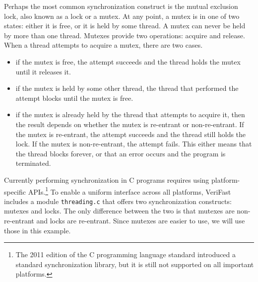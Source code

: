 \documentclass{article}
\begin{document}
Perhaps the most common synchronization construct is the mutual
exclusion lock, also known as a lock or a mutex. At any point,
a mutex is in one of two states: either it is free, or it is
held by some thread. A mutex can never be held by more than one
thread. Mutexes provide two operations: acquire and release.
When a thread attempts to acquire a mutex, there are two cases.
\begin{itemize}
\item if the mutex is free, the attempt succeeds and the
    thread holds the mutex until it releases it.
\item if the mutex is held by some other thread, the thread
    that performed the attempt blocks until the mutex is
    free.
\item if the mutex is already held by the thread that
    attempts to acquire it, then the result depends on
    whether the mutex is re-entrant or non-re-entrant. If
    the mutex is re-entrant, the attempt succeeds and the
    thread still holds the lock. If the mutex is
    non-re-entrant, the attempt fails. This either means
    that the thread blocks forever, or that an error occurs
    and the program is terminated.
\end{itemize}

Currently performing synchronization in C programs requires using platform-specific APIs.\footnote{The 2011 edition of the C programming language standard introduced a standard synchronization library, but it is still not supported on all important platforms.} To
enable a uniform interface across all platforms, VeriFast
includes a module \texttt{threading.c} that offers two
synchronization constructs: mutexes and locks. The only
difference between the two is that mutexes are non-re-entrant
and locks are re-entrant. Since mutexes are easier to use, we
will use those in this example.
\end{document}

